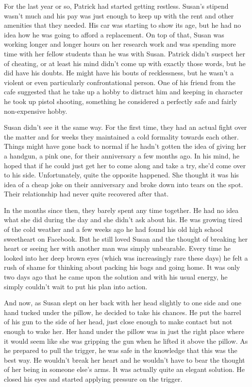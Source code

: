 \documentclass[11pt,letterpaper]{article}
\begin{document}
For the last year or so, Patrick had started getting restless. Susan's stipend wasn't much and his pay was just enough to keep up with the rent and other amenities that they needed. His car was starting to show its age, but he had no idea how he was going to afford a replacement. On top of that, Susan was working longer and longer hours on her research work and was spending more time with her fellow students than he was with Susan. Patrick didn't suspect her of cheating, or at least his mind didn't come up with exactly those words, but he did have his doubts. He might have his bouts of recklessness, but he wasn't a violent or even particularly confrontational person. One of his friend from the cafe suggested that he take up a hobby to distract him and keeping in character he took up pistol shooting, something he considered a perfectly safe and fairly non-expensive hobby.

Susan didn't see it the same way. For the first time, they had an actual fight over the matter and for weeks they maintained a cold formality towards each other. Things might have gone back to normal if he hadn't gotten the idea of giving her a handgun, a pink one, for their anniversary a few months ago. In his mind, he hoped that if he could just get her to come along and take a try, she'd come over to his side. Unfortunately, quite the opposite happened. She thought it was his idea of a cheap joke on their anniversary and broke down into tears on the spot. Their relationship had never quite recovered after that.

In the months since then, they barely spent any time together. He had no idea what she did during the day and she didn't ask about his. He was growing tired of the cold weather and a few weeks ago he had found his old high school sweetheart on Facebook. But he still loved Susan and the thought of breaking her heart or seeing her with another man was simply unbearable. Every time he looked into her deep brown eyes (which was increasingly rare these days) he felt a rush of shame for thinking about packing his bags and going home. It was only two days ago that he came upon the solution and with his usual energy, he simply couldn't wait to put his plan into action.

And now, as Susan slept on her back with her head slightly to one side and one hand tucked under the pillow, he decided to take his chances. He put the barrel of his gun to the side of her head, just close enough to make contact but not enough to wake her. Her hand under the pillow was in just the right place where it would seem like she was gripping the gun when he lifted it above the pillow. As he prepared to pull the trigger, he was safe in the knowledge that this was the best way. He wouldn't break her heart and he wouldn't have to bear the thought of her being in someone else's arms. It was actually quite an elegant solution. He closed his eyes and started applying pressure on the trigger.
\end{document}
